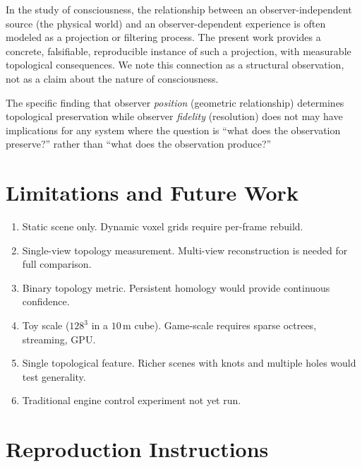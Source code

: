 \documentclass[11pt,a4paper]{article}
\theoremstyle{remark}
\begin{document}
In the study of consciousness, the relationship between an observer-independent source (the physical world) and an observer-dependent experience is often modeled as a projection or filtering process. The present work provides a concrete, falsifiable, reproducible instance of such a projection, with measurable topological consequences. We note this connection as a structural observation, not as a claim about the nature of consciousness.

The specific finding that observer \emph{position} (geometric relationship) determines topological preservation while observer \emph{fidelity} (resolution) does not may have implications for any system where the question is ``what does the observation preserve?'' rather than ``what does the observation produce?''

\section{Limitations and Future Work}
\label{sec:limits}

\begin{enumerate}[leftmargin=*]
    \item Static scene only. Dynamic voxel grids require per-frame rebuild.
    \item Single-view topology measurement. Multi-view reconstruction is needed for full comparison.
    \item Binary topology metric. Persistent homology would provide continuous confidence.
    \item Toy scale ($128^3$ in a $10\,\text{m}$ cube). Game-scale requires sparse octrees, streaming, GPU.
    \item Single topological feature. Richer scenes with knots and multiple holes would test generality.
    \item Traditional engine control experiment not yet run.
\end{enumerate}

\section{Reproduction Instructions}
\label{sec:repro}
\end{document}
